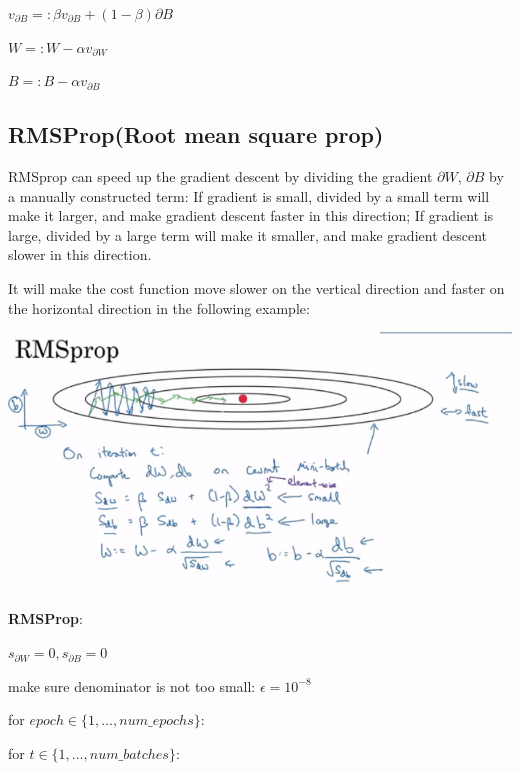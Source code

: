 \documentclass{article}
\begin{document}
\noindent \hspace{1cm} \(v_{\partial B} =: \beta v_{\partial B} + (1 - \beta) \partial B\)

\noindent \hspace{1cm} \(W =: W - \alpha v_{\partial W}\)

\noindent \hspace{1cm} \(B =: B - \alpha v_{\partial B}\)

\subsection{RMSProp(Root mean square prop)}

\noindent RMSprop can speed up the gradient descent by dividing the gradient \(\partial W\), \(\partial B\) by a manually constructed term: If gradient is small, divided by a small term will make it larger, and make gradient descent faster in this direction; If gradient is large, divided by a large term will make it smaller, and make gradient descent slower in this direction.

\bigskip

\noindent It will make the cost function move slower on the vertical direction and faster on the horizontal direction in the following example:

\begin{center}
\includegraphics[scale=0.4]{./images/RMSprop.png}
\end{center}

\noindent \textbf{RMSProp}:

\noindent \(s_{\partial W} = 0, s_{\partial B} = 0\)

\noindent make sure denominator is not too small: \(\epsilon = 10^{-8}\)

\noindent for \(epoch \in \{1, \dots, num\_epochs\}\):

\noindent \hspace{.5cm} for \(t \in \{1, \dots, num\_batches\}\):
\end{document}
